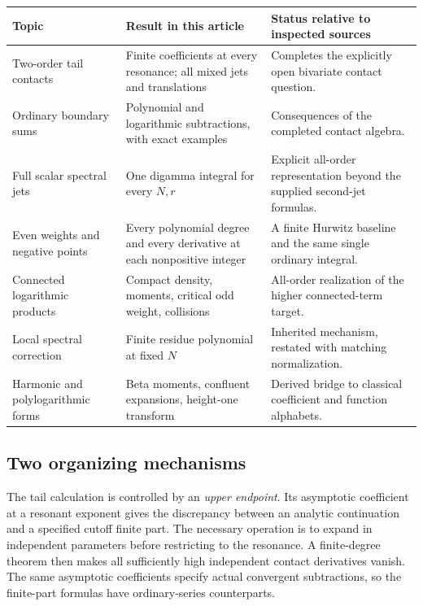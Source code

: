 \documentclass[11pt,letterpaper]{article}
\numberwithin{equation}{section}
\theoremstyle{definition}
\theoremstyle{remark}
\begin{document}
\begin{center}
\small
\renewcommand{\arraystretch}{1.25}
\begin{tabular}{>{\raggedright\arraybackslash}p{}>{\raggedright\arraybackslash}p{}>{\raggedright\arraybackslash}p{}}
\toprule
Topic & Result in this article & Status relative to inspected sources\\
\midrule
Two-order tail contacts &
Finite coefficients at every resonance; all mixed jets and translations &
Completes the explicitly open bivariate contact question.\\
Ordinary boundary sums &
Polynomial and logarithmic subtractions, with exact examples &
Consequences of the completed contact algebra.\\
Full scalar spectral jets &
One digamma integral for every \(N,r\) &
Explicit all-order representation beyond the supplied second-jet formulas.\\
Even weights and negative points &
Every polynomial degree and every derivative at each nonpositive integer &
A finite Hurwitz baseline and the same single ordinary integral.\\
Connected logarithmic products &
Compact density, moments, critical odd weight, collisions &
All-order realization of the higher connected-term target.\\
Local spectral correction &
Finite residue polynomial at fixed \(N\) &
Inherited mechanism, restated with matching normalization.\\
Harmonic and polylogarithmic forms &
Beta moments, confluent expansions, height-one transform &
Derived bridge to classical coefficient and function alphabets.\\
\bottomrule
\end{tabular}
\end{center}

\subsection{Two organizing mechanisms}

The tail calculation is controlled by an \emph{upper endpoint}. Its
asymptotic coefficient at a resonant exponent gives the discrepancy between
an analytic continuation and a specified cutoff finite part. The necessary
operation is to expand in independent parameters before restricting to the
resonance. A finite-degree theorem then makes all sufficiently high
independent contact derivatives vanish. The same asymptotic coefficients
specify actual convergent subtractions, so the finite-part formulas have
ordinary-series counterparts.
\end{document}
